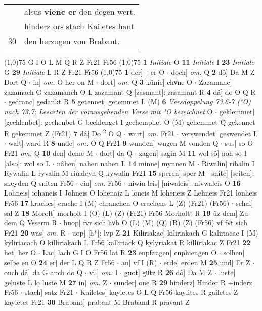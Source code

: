 \documentclass[8pt,a4paper,notitlepage]{article}
\begin{document}
\begin{table}[ht]
\begin{minipage}[t]{0.5\linewidth}
\begin{tabular}{rl}
 & alsus \textbf{vienc er} den degen wert.\\ 
 & hinderz ors stach Kailetes hant\\ 
30 & den herzogen von Brabant.\\ 
\end{tabular}
\scriptsize
\line(1,0){75} \newline
G I O L M Q R Z Fr21 Fr56 \newline
\line(1,0){75} \newline
\textbf{1} \textit{Initiale} O  \textbf{11} \textit{Initiale} I  \textbf{23} \textit{Initiale} G  \textbf{29} \textit{Initiale} L R Z Fr21 Fr56  \newline
\line(1,0){75} \newline
\textbf{1} der] ÷er O  $\cdot$ doch] \textit{om.} Q \textbf{2} dô] Da M Z Dort Q  $\cdot$ in] \textit{om.} O her on M  $\cdot$ dort] \textit{om.} Q \textbf{3} künic] chvͦne O  $\cdot$ Zazamanc] zazamach G zazamanch O L zazamant Q [zasmant]: zasamant R \textbf{4} dâ] do O Q R  $\cdot$ gedranc] gedankt R \textbf{5} getennet] getemmet L (M) \textbf{6} \textit{Versdoppelung 73.6-7 (²O) nach 73.7; Lesarten der vorausgehenden Verse mit ¹O bezeichnet} O   $\cdot$ geklemmet] [gechlenbet]: gechenbet G bechlenget I gechemphet O (M) gehemmet Q gekennet R gekemmet Z (Fr21) \textbf{7} dâ] Do \textsuperscript{2}\hspace{-1.3mm} O Q  $\cdot$ wart] \textit{om.} Fr21  $\cdot$ verswendet] geswendet L  $\cdot$ walt] ward R \textbf{8} unde] \textit{om.} O Q Fr21 \textbf{9} wunden] wugen M vonden Q  $\cdot$ sus] so O Fr21 \textit{om.} Q \textbf{10} den] deme M  $\cdot$ dort] da Q  $\cdot$ zagen] sagin M \textbf{11} wol sô] noh so I [also]: wol so L  $\cdot$ nâhen] nahen nahen L \textbf{14} minne] mynnen M  $\cdot$ Riwalin] ribalin I Rywalin L ryvalin M riualeyn Q kywalin Fr21 \textbf{15} speren] sper M  $\cdot$ snîte] [seiten]: sneyden Q sniten Fr56  $\cdot$ ein] \textit{om.} Fr56  $\cdot$ niwiu leis] [niwaleis]: nivwaleis O \textbf{16} Lohneis] iohaneis I Johneis O lohenaiz L loneis M loheneis Z Lehneis Fr21 lonheis Fr56 \textbf{17} kraches] crache I (M) chranchen O crachens L (Z) (Fr21) (Fr56)  $\cdot$ schal] sal Z \textbf{18} Morolt] morholt I (O) (L) (Z) (Fr21) Fr56 Morholtt R \textbf{19} ûz dem] Zu dem Q Vsserm R  $\cdot$ huop] fvr sich hvͦb O (L) (M) (Q) (R) (Z) (Fr56) vf fvͦr sich Fr21 \textbf{20} was] \textit{om.} R  $\cdot$ uop] [h*]: lvp Z \textbf{21} Kiliriakac] kiliriakach G kaliriacac I (M) kyliriacach O killiriakach L Fr56 kalliriack Q kylyriakat R killiriakac Z Fr21 \textbf{22} het] her O  $\cdot$ Lac] lach G I O Fr56 lat R \textbf{23} enpfangen] enphiengen O  $\cdot$ solhen] selbe en O \textbf{24} er] der L Q R Z Fr56  $\cdot$ an] vf I (R)  $\cdot$ erde] erden M \textbf{25} und] Er Z  $\cdot$ ouch dâ] da G auch do Q  $\cdot$ vil] \textit{om.} I  $\cdot$ guot] guͦtz R \textbf{26} dô] Da M Z  $\cdot$ luste] geluste L lo luste M \textbf{27} in] \textit{om.} Z  $\cdot$ sunder] one R \textbf{29} hinderz] Hinder R ÷inderz Fr56  $\cdot$ stach] satz Fr21  $\cdot$ Kailetes] kayletes O L Q Fr56 kaylites R gailetes Z kayletet Fr21 \textbf{30} Brabant] prabant M Braband R pravant Z \newline

\end{minipage}
\end{table}
\end{document}
